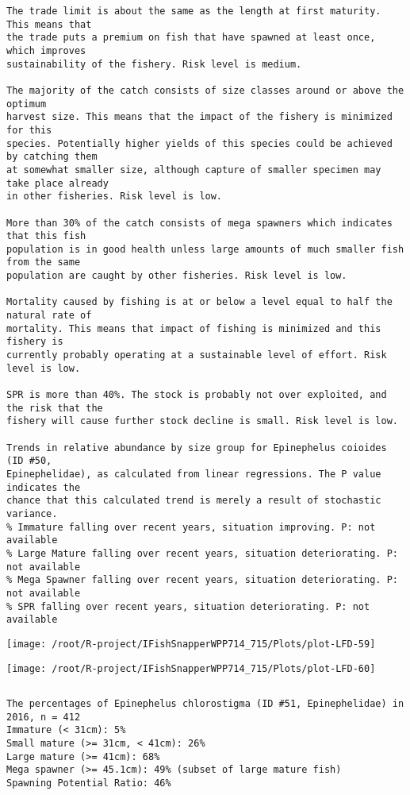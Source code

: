 \documentclass{report}\usepackage[]{graphicx}\usepackage[]{color}
\makeatletter
\def\maxwidth{ %
  \ifdim\Gin@nat@width>\linewidth
    \linewidth
  \else
    \Gin@nat@width
  \fi
}
\newenvironment{kframe}{%
 \def\at@end@of@kframe{}%
 \ifinner\ifhmode%
  \def\at@end@of@kframe{\end{minipage}}%
  \begin{minipage}{\columnwidth}%
 \fi\fi%
 \def\FrameCommand##1{\hskip\@totalleftmargin \hskip-\fboxsep
 \colorbox{shadecolor}{##1}\hskip-\fboxsep
     \hskip-\linewidth \hskip-\@totalleftmargin \hskip\columnwidth}%
 \MakeFramed {\advance\hsize-\width
   \@totalleftmargin\z@ \linewidth\hsize
   \@setminipage}}%
 {\par\unskip\endMakeFramed%
 \at@end@of@kframe}
\newenvironment{knitrout}{}{} %
\makeatother
\begin{document}
\begin{knitrout}
\begin{kframe}
\begin{verbatim}
The trade limit is about the same as the length at first maturity.  This means that
the trade puts a premium on fish that have spawned at least once, which improves
sustainability of the fishery. Risk level is medium.

The majority of the catch consists of size classes around or above the optimum
harvest size. This means that the impact of the fishery is minimized for this
species. Potentially higher yields of this species could be achieved by catching them
at somewhat smaller size, although capture of smaller specimen may take place already
in other fisheries. Risk level is low.

More than 30% of the catch consists of mega spawners which indicates that this fish
population is in good health unless large amounts of much smaller fish from the same
population are caught by other fisheries. Risk level is low.
 
Mortality caused by fishing is at or below a level equal to half the natural rate of
mortality. This means that impact of fishing is minimized and this fishery is
currently probably operating at a sustainable level of effort. Risk level is low.
 
SPR is more than 40%. The stock is probably not over exploited, and the risk that the
fishery will cause further stock decline is small. Risk level is low.
 
Trends in relative abundance by size group for Epinephelus coioides (ID #50,
Epinephelidae), as calculated from linear regressions. The P value indicates the
chance that this calculated trend is merely a result of stochastic variance.
% Immature falling over recent years, situation improving. P: not available
% Large Mature falling over recent years, situation deteriorating. P: not available
% Mega Spawner falling over recent years, situation deteriorating. P: not available
% SPR falling over recent years, situation deteriorating. P: not available
\end{verbatim}
\end{kframe}
\texttt{[image: /root/R-project/IFishSnapperWPP714\_715/Plots/plot-LFD-59]} 

\texttt{[image: /root/R-project/IFishSnapperWPP714\_715/Plots/plot-LFD-60]} 
\begin{kframe}\begin{verbatim}
\end{verbatim}
\end{kframe}
\clearpage
\newpage
\begin{kframe}\begin{verbatim}The percentages of Epinephelus chlorostigma (ID #51, Epinephelidae) in 2016, n = 412
Immature (< 31cm): 5%
Small mature (>= 31cm, < 41cm): 26%
Large mature (>= 41cm): 68%
Mega spawner (>= 45.1cm): 49% (subset of large mature fish)
Spawning Potential Ratio: 46%
 

\end{verbatim}
\end{kframe}
\end{knitrout}
\end{document}
